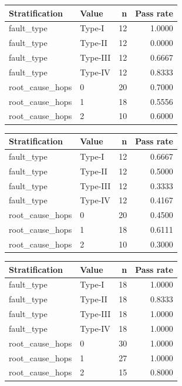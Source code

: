 \begin{table}[ht]
\centering
\begin{tabular}{llrr}
Stratification & Value & n & Pass rate \\
\hline
fault_type & Type-I & 12 & 1.0000 \\
fault_type & Type-II & 12 & 0.0000 \\
fault_type & Type-III & 12 & 0.6667 \\
fault_type & Type-IV & 12 & 0.8333 \\
root_cause_hops & 0 & 20 & 0.7000 \\
root_cause_hops & 1 & 18 & 0.5556 \\
root_cause_hops & 2 & 10 & 0.6000 \\
\end{tabular}
\end{table}
\begin{table}[ht]
\centering
\begin{tabular}{llrr}
Stratification & Value & n & Pass rate \\
\hline
fault_type & Type-I & 12 & 0.6667 \\
fault_type & Type-II & 12 & 0.5000 \\
fault_type & Type-III & 12 & 0.3333 \\
fault_type & Type-IV & 12 & 0.4167 \\
root_cause_hops & 0 & 20 & 0.4500 \\
root_cause_hops & 1 & 18 & 0.6111 \\
root_cause_hops & 2 & 10 & 0.3000 \\
\end{tabular}
\end{table}
\begin{table}[ht]
\centering
\begin{tabular}{llrr}
Stratification & Value & n & Pass rate \\
\hline
fault_type & Type-I & 18 & 1.0000 \\
fault_type & Type-II & 18 & 0.8333 \\
fault_type & Type-III & 18 & 1.0000 \\
fault_type & Type-IV & 18 & 1.0000 \\
root_cause_hops & 0 & 30 & 1.0000 \\
root_cause_hops & 1 & 27 & 1.0000 \\
root_cause_hops & 2 & 15 & 0.8000 \\
\end{tabular}
\end{table}

